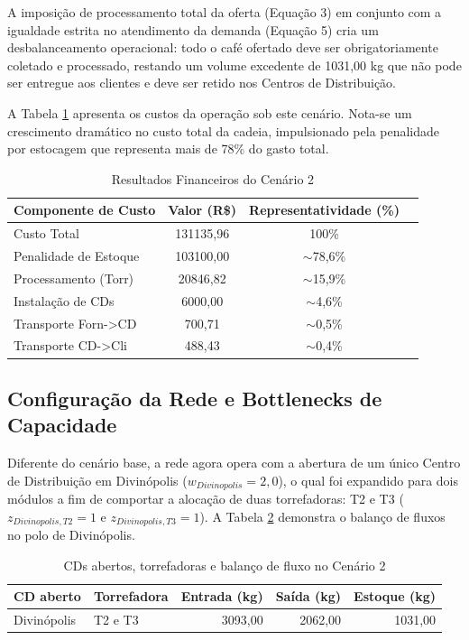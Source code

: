 \documentclass[a4paper,11pt]{article}
\begin{document}
A imposição de processamento total da oferta (Equação 3) em conjunto com a igualdade estrita no atendimento da demanda (Equação 5) cria um desbalanceamento operacional: todo o café ofertado deve ser obrigatoriamente coletado e processado, restando um volume excedente de 1031,00 kg que não pode ser entregue aos clientes e deve ser retido nos Centros de Distribuição.

A Tabela \ref{tab:cenario2_custos} apresenta os custos da operação sob este cenário. Nota-se um crescimento dramático no custo total da cadeia, impulsionado pela penalidade por estocagem que representa mais de 78\% do gasto total.

\begin{table}[H]
\centering
\begin{tabular}{lccc}
\hline
\textbf{Componente de Custo} & \textbf{Valor (R\$)} & \textbf{Representatividade (\%)} \\ \hline
Custo Total             & 131135,96  & 100\%     \\
Penalidade de Estoque   & 103100,00  & $\sim$78,6\%  \\
Processamento (Torr)    &  20846,82  & $\sim$15,9\%  \\
Instalação de CDs       &   6000,00  & $\sim$4,6\%  \\
Transporte Forn->CD     &    700,71  & $\sim$0,5\%  \\
Transporte CD->Cli      &    488,43  & $\sim$0,4\%    \\
\hline
\end{tabular}
\caption{Resultados Financeiros do Cenário 2}
\label{tab:cenario2_custos}
\end{table}

\subsection{Configuração da Rede e Bottlenecks de Capacidade}

Diferente do cenário base, a rede agora opera com a abertura de um único Centro de Distribuição em Divinópolis ($w_{Divinopolis} = 2,0$), o qual foi expandido para dois módulos a fim de comportar a alocação de duas torrefadoras: T2 e T3 ($z_{Divinopolis, T2} = 1$ e $z_{Divinopolis, T3} = 1$). A Tabela \ref{tab:cenario2_cds} demonstra o balanço de fluxos no polo de Divinópolis.

\begin{table}[H]
\centering
\begin{tabular}{llrrr}
\hline
\textbf{CD aberto} & \textbf{Torrefadora} & \textbf{Entrada (kg)} & \textbf{Saída (kg)} & \textbf{Estoque (kg)} \\ \hline
Divinópolis & T2 e T3 & 3093,00 & 2062,00 & 1031,00 \\ \hline
\end{tabular}
\caption{CDs abertos, torrefadoras e balanço de fluxo no Cenário 2}
\label{tab:cenario2_cds}
\end{table}
\end{document}
